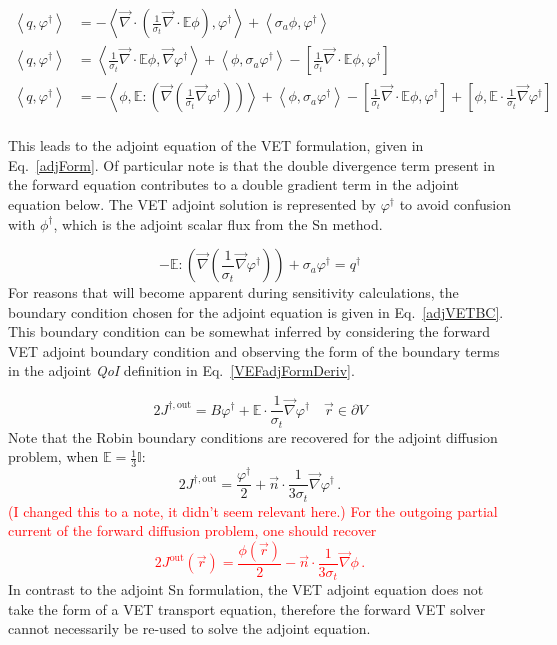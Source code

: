 \documentclass[12pt]{report}
\newcommand{\vr}{\vec{r}}
\newcommand{\bra}{\left\langle}
\newcommand{\ket}{\right\rangle}
\newcommand{\sbra}{\left[}
\newcommand{\sket}{\right]}
\renewcommand{\div}{\vec{\nabla} \cdot}
\newcommand{\grad}{\vec{\nabla}}
\newcommand{\vefadj}{\varphi^\dag}
\newcommand{\bound}{\partial V}
\newcommand{\vn}{\vec{n}}
\newcommand{\Edd}{\mathbb{E}}
\newcommand{\sigt}{\sigma_t}
\newcommand{\siga}{\sigma_a}
\newcommand{\scalSource}{q}
\newcommand{\scalResp}{q^\dag}
\newcommand{\qoi}{{\it QoI}\xspace}
\newcommand{\comment}[2]{\marginpar{\textcolor{#2}{$\star$}}\textcolor{#2}{#1}\newline}
\newcommand{\iwh}[1]{\comment{#1}{red}}
\newcommand{\iwh}[1]{\phantom{a}}
\begin{document}
\begin{equation}
\label{VEFadjFormDeriv}
\begin{split}
\bra \scalSource , \vefadj \ket &= - \bra \div \left( \frac{1}{\sigt}\div \Edd \phi \right), \vefadj \ket +  \bra \siga \phi, \vefadj \ket   \\
 \bra \scalSource , \vefadj \ket &= \bra \frac{1}{\sigt}\div \Edd \phi, \grad \vefadj \ket  +  \bra  \phi, \siga \vefadj \ket - \sbra \frac{1}{\sigt}\div \Edd \phi, \vefadj \sket   \\
 \bra \scalSource , \vefadj \ket &=  - \bra \phi, \Edd : \left( \grad \left( \frac{1}{\sigt}\grad \vefadj \right) \right) \ket  +  \bra  \phi, \siga \vefadj \ket - \sbra \frac{1}{\sigt}\div \Edd \phi, \vefadj \sket + \sbra \phi, \Edd \cdot \frac{1}{\sigt} \grad \vefadj \sket \\
\end{split}
\end{equation}

This leads to the adjoint equation of the VET formulation, given in Eq.~\eqref{adjForm}. Of particular note is that the double divergence term present in the forward equation contributes to a double gradient term in the adjoint equation below. The VET adjoint solution is represented by $\vefadj$ to avoid confusion with $\phi^\dag$, which is the adjoint scalar flux from the Sn method. 

\begin{equation}
\label{adjForm}
- \Edd : \left( \grad \left( \frac{1}{\sigt}\grad \vefadj \right) \right) + \siga \vefadj = \scalResp
\end{equation}
For reasons that will become apparent during sensitivity calculations, the boundary condition chosen for the adjoint equation is given in Eq.~\eqref{adjVETBC}. This boundary condition can be somewhat inferred by considering the forward VET adjoint boundary condition and observing the form of the boundary terms in the adjoint \qoi definition in Eq.~\eqref{VEFadjFormDeriv}.

\begin{equation}
\label{adjVETBC}
2J^{\dag,\text{out}} = B \vefadj+ 
\Edd \cdot \frac{1}{\sigma_{t} } \vec{\nabla} \vefadj   \quad \vr \in \bound
\end{equation}
Note that the Robin boundary conditions are recovered for the adjoint diffusion problem, when $\Edd = \tfrac{1}{3} \mathbb{I}$:
\[
2 J^{\dag,\text{out}} = \frac{\vefadj}{2} + \vn \cdot \frac{1}{3\sigt} \grad \vefadj \,.
\]
\iwh{ (I changed this to a note, it didn't seem relevant here.) For the outgoing partial current of the forward diffusion problem, one should recover
\[
2 J^{\text{out}}(\vr) = \frac{\phi(\vr)}{2} \boxed{-} \vn \cdot \frac{1}{3\sigt} \grad \phi \,.
\]}
In contrast to the adjoint Sn formulation, the VET adjoint equation does not take the form of a VET transport equation, therefore the forward VET solver 
cannot necessarily be re-used to solve the adjoint equation. 
\end{document}
